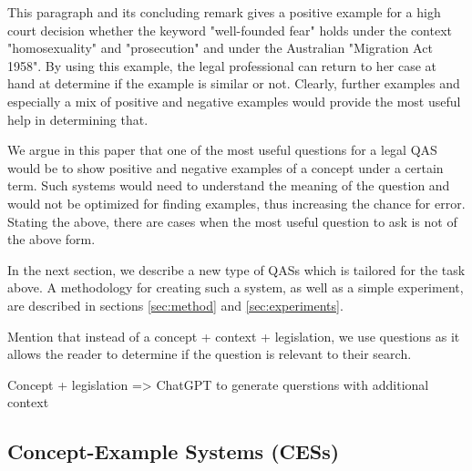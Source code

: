 This paragraph and its concluding remark gives a positive example for a high court decision whether the keyword "well-founded fear" holds under the context "homosexuality" and "prosecution" and under the Australian "Migration Act 1958". By using this example, the legal professional can return to her case at hand at determine if the example is similar or not. Clearly, further examples and especially a mix of positive and negative examples would provide the most useful help in determining that.

We argue in this paper that one of the most useful questions for a legal QAS would be to show positive and negative examples of a concept under a certain term. Such systems would need to understand the meaning of the question and would not be optimized for finding examples, thus increasing the chance for error. Stating the above, there are cases when the most useful question to ask is not of the above form.

In the next section, we describe a new type of QASs which is tailored for the task above. A methodology for creating such a system, as well as a simple experiment, are described in sections \ref{sec:method} and \ref{sec:experiments}.

Mention that instead of a concept + context + legislation, we use questions as it allows the reader to determine if the question is relevant to their search.

Concept + legislation => ChatGPT to generate querstions with additional context
\subsection{Concept-Example Systems (CESs)}